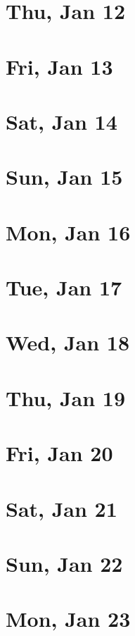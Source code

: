 	\section{Thu, Jan 12}
		
	\section{Fri, Jan 13}
		
	\section{Sat, Jan 14}
		
	\section{Sun, Jan 15}
		
	\section{Mon, Jan 16}
		
	\section{Tue, Jan 17}
		
	\section{Wed, Jan 18}
		
	\section{Thu, Jan 19}
		
	\section{Fri, Jan 20}
		
	\section{Sat, Jan 21}
		
	\section{Sun, Jan 22}
		
	\section{Mon, Jan 23}
		
